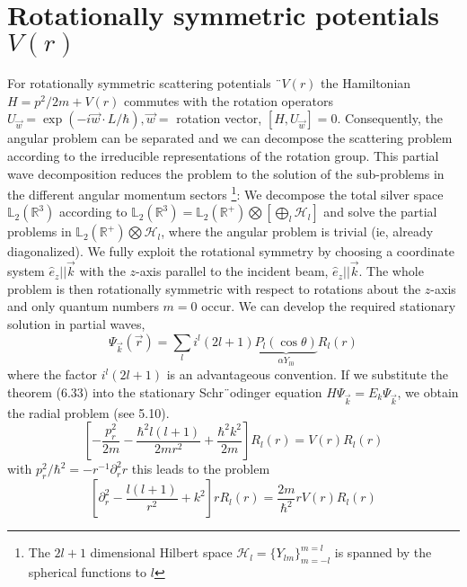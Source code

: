 \section{Rotationally symmetric potentials $V (r)$}
For rotationally symmetric scattering potentials ¨$V (r)$ the Hamiltonian $H = p^2 / 2m + V (r)$ commutes with the rotation operators $U_{\vec{w}} = \operatorname{exp} (-i \vec{w} \cdot L / \hbar), \vec{w} =$ rotation vector, $[H,U_{\vec{w}}] = 0$. Consequently, the angular problem can be separated and we can decompose the scattering problem according to the irreducible representations of the rotation group. This partial wave decomposition reduces the problem to the solution of the sub-problems in the different angular momentum sectors \footnote{The $2l + 1$ dimensional Hilbert space $\mathcal{H}_l = \{Y_{lm}\}^{m = l}_{m = -l}$ is spanned by the spherical functions to $l$}: We decompose the total silver space $\mathbb{L}_2 (\mathbb{R}^3)$ according to $\mathbb{L}_2 (\mathbb{R}^3) = \mathbb{L}_2 (\mathbb{R}^+) \bigotimes [\bigoplus_l\mathcal{H}_l]$ and solve the partial problems in $\mathbb{L}_2 (\mathbb{R}^+) \bigotimes \mathcal{H}_l$, where the angular problem is trivial (ie, already diagonalized). We fully exploit the rotational symmetry by choosing a coordinate system $\hat{e}_z || \vec{k}$ with the $z$-axis parallel to the incident beam, $\hat{e}_z||\vec{k}$. The whole problem is then rotationally symmetric with respect to rotations about the $z$-axis and only quantum numbers $m = 0$ occur. We can develop the required stationary solution in partial waves,
\begin{equation}
    \Psi_{\vec{k}}(\vec{r})=\sum_{l} i^{l}(2 l+1) \underbrace{P_{l}(\cos \theta)}_{\alpha Y_{l 0}} R_{l}(r)
    \end{equation}
where the factor $i^l (2l + 1)$ is an advantageous convention. If we substitute the theorem (6.33) into the stationary Schr¨odinger equation $H\Psi_{\vec{k}} = E_k\Psi_{\vec{k}}$, we obtain the radial problem (see 5.10).
\begin{equation}
    \left[-\frac{p_{r}^{2}}{2 m}-\frac{\hbar^{2} l(l+1)}{2 m r^{2}}+\frac{\hbar^{2} k^{2}}{2 m}\right] R_{l}(r)=V(r) R_{l}(r)
    \end{equation}
with $p_r^2/\hbar^2=-r^{-1}\partial_r^2 r$ this leads to the problem
\begin{equation}
    \left[\partial_{r}^{2}-\frac{l(l+1)}{r^{2}}+k^{2}\right] r R_{l}(r)=\frac{2 m}{\hbar^{2}} r V(r) R_{l}(r)
    \end{equation}

